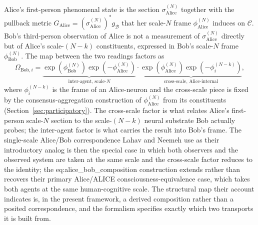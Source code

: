 \documentclass[11pt]{article}
\begin{document}
Alice's first-person phenomenal state is the section $\sigma_{\mathrm{Alice}}^{(N)}$ together with the pullback metric $G_{\mathrm{Alice}} = (\sigma_{\mathrm{Alice}}^{(N)})^* g_{\mathcal{B}}$ that her scale-$N$ frame $\phi_{\mathrm{Alice}}^{(N)}$ induces on $\mathcal{C}$. Bob's third-person observation of Alice is not a measurement of $\sigma_{\mathrm{Alice}}^{(N)}$ directly but of Alice's scale-$(N-k)$ constituents, expressed in Bob's scale-$N$ frame $\phi_{\mathrm{Bob}}^{(N)}$. The map between the two readings factors as
\begin{equation}
\Omega_{\mathrm{Bob}, i}
=
\underbrace{\exp(\phi_{\mathrm{Bob}}^{(N)}) \exp(-\phi_{\mathrm{Alice}}^{(N)})}_{\text{inter-agent, scale-}N}
\cdot
\underbrace{\exp(\phi_{\mathrm{Alice}}^{(N)}) \exp(-\phi_{i}^{(N-k)})}_{\text{cross-scale, Alice-internal}},
\label{eq:alice_bob_composition}
\end{equation}
where $\phi_i^{(N-k)}$ is the frame of an Alice-neuron and the cross-scale piece is fixed by the consensus-aggregation construction of $\phi_{\mathrm{Alice}}^{(N)}$ from its constituents (Section~\ref{sec:participatory}). The cross-scale factor is what relates Alice's first-person scale-$N$ section to the scale-$(N-k)$ neural substrate Bob actually probes; the inter-agent factor is what carries the result into Bob's frame. The single-scale Alice/Bob correspondence Lahav and Neemeh use as their introductory analog is then the special case in which both observers and the observed system are taken at the same scale and the cross-scale factor reduces to the identity; the eq:alice_bob_composition construction extends rather than recovers their primary Alice/ALICE consciousness-equivalence case, which takes both agents at the same human-cognitive scale. The structural map their account indicates is, in the present framework, a derived composition rather than a posited correspondence, and the formalism specifies exactly which two transports it is built from.
\end{document}

